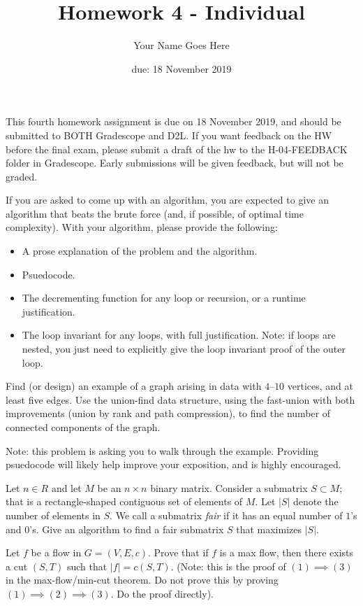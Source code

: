 \documentclass{article}
\author{Your Name Goes Here}
\date{due: 18 November 2019}
\title{Homework 4 - Individual}
\begin{document}
\maketitle

This fourth homework assignment is due on 18 November 2019, and should be
submitted to BOTH Gradescope and D2L.  If you want feedback on the HW before the
final exam, please submit a draft of the hw to the H-04-FEEDBACK folder in
Gradescope.  Early submissions will be given feedback, but will not be graded.

If you are asked to come up with an algorithm, you are expected to give an
algorithm that beats the brute force (and, if possible, of optimal time
complexity).
With your algorithm, please provide the following:
\begin{itemize}
\item A prose explanation of the problem and the algorithm.
\item Psuedocode.
\item The decrementing function for any loop or recursion, or a runtime
justification.
\item The loop invariant for any loops, with full justification.  Note: if
loops are nested, you just need to explicitly give the loop invariant
proof of the outer loop.
\end{itemize}

\nextprob
Find (or design) an example of a graph arising in data
with $4$--$10$ vertices, and at least five
edges.  Use the union-find data structure, using the fast-union with both
improvements (union by rank and path compression), to find the number of
connected components of the graph.

Note: this problem is asking you to walk through the example.  Providing
psuedocode will likely help improve your exposition, and is highly encouraged.

\nextprob
Let $n \in R$ and let $M$ be an $n \times n$ binary matrix.  Consider a
submatrix $S \subset M$; that is a rectangle-shaped contiguous set of
elements of $M$.  Let $|S|$ denote the number of elements in $S$.  We call a
submatrix \emph{fair} if it has an equal number of $1$'s and $0$'s.  Give an
algorithm to find a fair submatrix $S$ that maximizes $|S|$.

\nextprob
Let $f$ be a flow in $G=(V,E,c)$.  Prove that if $f$ is a max flow, then there
exists a cut $(S,T)$ such that $|f| = c(S,T)$.  (Note: this is the proof of $(1)
\implies (3)$ in the max-flow/min-cut theorem.  Do not prove this by proving
$(1) \implies (2) \implies (3)$.  Do the proof directly).
\end{document}
